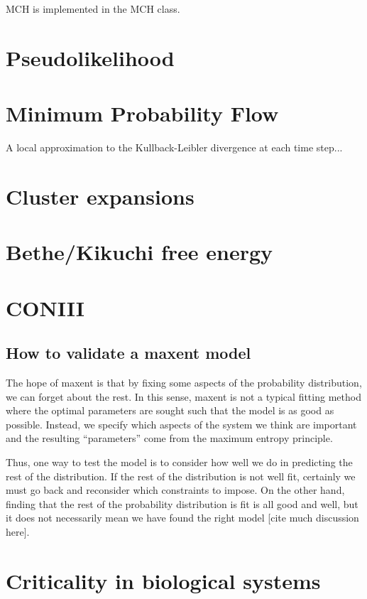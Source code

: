 \documentclass[aps,prl,twocolumn]{revtex4-1}
\begin{document}
MCH is implemented in the MCH class.

\section{Pseudolikelihood}

\section{Minimum Probability Flow}
A local approximation to the Kullback-Leibler divergence at each time step...
\cite{SohlDickstein:2011im}

\section{Cluster expansions}

\section{Bethe/Kikuchi free energy}

\section{CONIII}

\subsection{How to validate a maxent model}
The hope of maxent is that by fixing some aspects of the probability distribution, we can forget about the rest. In this sense, maxent is not a typical fitting method where the optimal parameters are sought such that the model is as good as possible. Instead, we specify which aspects of the system we think are important and the resulting ``parameters'' come from the maximum entropy principle.

Thus, one way to test the model is to consider how well we do in predicting the rest of the distribution. If the rest of the distribution is not well fit, certainly we must go back and reconsider which constraints to impose. On the other hand, finding that the rest of the probability distribution is fit is all good and well, but it does not necessarily mean we have found the right model [cite much discussion here].

\section{Criticality in biological systems}
\end{document}
